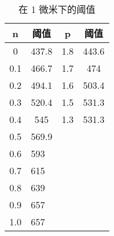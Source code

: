 \documentclass[lang=cn,11pt,a4paper,cite=authoryear]{elegantpaper}
\begin{document}
\begin{table}[htb]
    \caption{在 1 微米下的阈值}
    \centering
    \label{t1}
    \begin{tabular}{cccc}
    \toprule
    n                       & 阈值                      & p                    & 阈值                   \\
    \midrule
    0                       & 437.8                   & 1.8                  & 443.6                \\
    0.1                     & 466.7                   & 1.7                  & 474                  \\
    0.2                     & 494.1                   & 1.6                  & 503.4                \\
    0.3                     & 520.4                   & 1.5                  & 531.3                \\
    0.4                     & 545                     & 1.3                  & 531.3                \\
    0.5                     & 569.9                   &                      &                      \\
    \multicolumn{1}{l}{0.6} & \multicolumn{1}{l}{593} & \multicolumn{1}{l}{} & \multicolumn{1}{l}{} \\
    \multicolumn{1}{l}{0.7} & \multicolumn{1}{l}{615} & \multicolumn{1}{l}{} & \multicolumn{1}{l}{} \\
    \multicolumn{1}{l}{0.8} & \multicolumn{1}{l}{639} & \multicolumn{1}{l}{} & \multicolumn{1}{l}{} \\
    \multicolumn{1}{l}{0.9} & \multicolumn{1}{l}{657} & \multicolumn{1}{l}{} & \multicolumn{1}{l}{} \\
    \multicolumn{1}{l}{1.0} & \multicolumn{1}{l}{657} & \multicolumn{1}{l}{} & \multicolumn{1}{l}{} \\ 
    \bottomrule
    \end{tabular}
\end{table}


\end{document}
